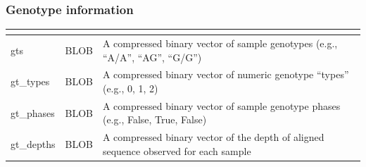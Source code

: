 \documentclass[letterpaper,10pt,english]{sphinxmanual}
\begin{document}
\subsubsection{Genotype information}
\label{content/database_schema:genotype-information}
\begin{tabulary}{\linewidth}{|L|L|L|}
\hline
\textbf{} & \textbf{} & \textbf{}\\\hline

gts
 & 
BLOB
 & 
A compressed binary vector of sample genotypes (e.g., ``A/A'', ``A\textbar{}G'', ``G/G'')
\\\hline

gt\_types
 & 
BLOB
 & 
A compressed binary vector of numeric genotype ``types'' (e.g., 0, 1, 2)
\\\hline

gt\_phases
 & 
BLOB
 & 
A compressed binary vector of sample genotype phases (e.g., False, True, False)
\\\hline

gt\_depths
 & 
BLOB
 & 
A compressed binary vector of the depth of aligned sequence observed for each sample
\\\hline
\end{tabulary}
\end{document}
